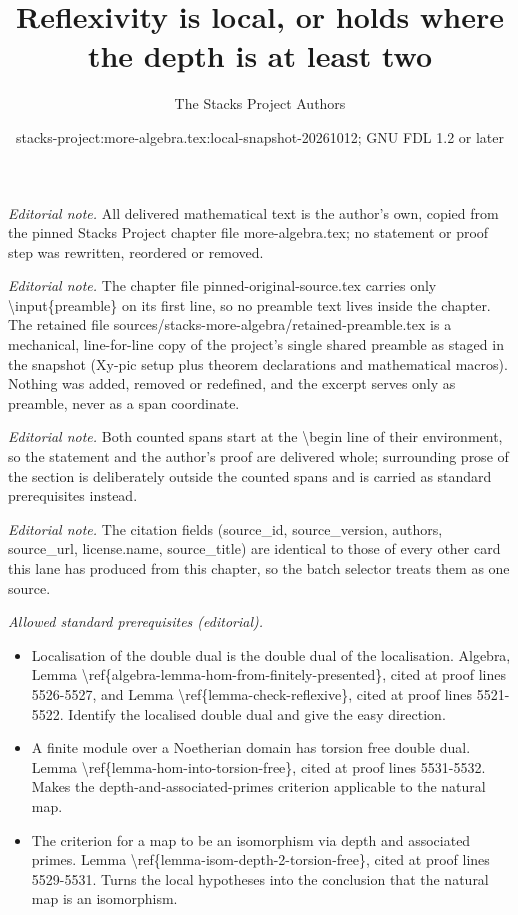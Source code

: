\documentclass[10pt,a4paper]{amsart}
\title{Reflexivity is local, or holds where the depth is at least two}
\author{The Stacks Project Authors}
\date{stacks-project:more-algebra.tex:local-snapshot-20261012; GNU FDL 1.2 or later}
\theoremstyle{plain}
\theoremstyle{definition}
\theoremstyle{remark}
\numberwithin{equation}{subsection}
\begin{document}
\maketitle
\setcounter{subsection}{1}
\noindent\textit{Editorial note.} All delivered mathematical text is the author's own, copied from the pinned Stacks Project chapter file more-algebra.tex; no statement or proof step was rewritten, reordered or removed.\par\medskip
\noindent\textit{Editorial note.} The chapter file pinned-original-source.tex carries only \textbackslash{}input\{preamble\} on its first line, so no preamble text lives inside the chapter. The retained file sources/stacks-more-algebra/retained-preamble.tex is a mechanical, line-for-line copy of the project's single shared preamble as staged in the snapshot (Xy-pic setup plus theorem declarations and mathematical macros). Nothing was added, removed or redefined, and the excerpt serves only as preamble, never as a span coordinate.\par\medskip
\noindent\textit{Editorial note.} Both counted spans start at the \textbackslash{}begin line of their environment, so the statement and the author's proof are delivered whole; surrounding prose of the section is deliberately outside the counted spans and is carried as standard prerequisites instead.\par\medskip
\noindent\textit{Editorial note.} The citation fields (source\_id, source\_version, authors, source\_url, license.name, source\_title) are identical to those of every other card this lane has produced from this chapter, so the batch selector treats them as one source.\par\medskip
\noindent\textit{Allowed standard prerequisites (editorial).}\begin{itemize}
\item Localisation of the double dual is the double dual of the localisation. Algebra, Lemma \textbackslash{}ref\{algebra-lemma-hom-from-finitely-presented\}, cited at proof lines 5526-5527, and Lemma \textbackslash{}ref\{lemma-check-reflexive\}, cited at proof lines 5521-5522. Identify the localised double dual and give the easy direction.
\item A finite module over a Noetherian domain has torsion free double dual. Lemma \textbackslash{}ref\{lemma-hom-into-torsion-free\}, cited at proof lines 5531-5532. Makes the depth-and-associated-primes criterion applicable to the natural map.
\item The criterion for a map to be an isomorphism via depth and associated primes. Lemma \textbackslash{}ref\{lemma-isom-depth-2-torsion-free\}, cited at proof lines 5529-5531. Turns the local hypotheses into the conclusion that the natural map is an isomorphism.
\end{itemize}\medskip
\end{document}
